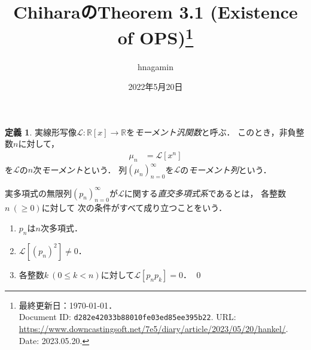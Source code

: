 \documentclass{jlreq}
\theoremstyle{definition}
\newtheorem{definition}[theorem]{定義}
\newcommand{\functype}[3]{#1\colon#2\longrightarrow#3}
\newcommand{\mcL}{\mathcal{L}}
\newcommand{\polynoms}[2]{#1[#2]}
\newcommand{\realnums}{\mathbb{R}}
\newcommand{\sequence}[3]{\sequenceparen{#1}{#2}{#3}{(}{)}} %
\newcommand{\sequenceparen}[5]{{#4#1#5}_{#2}^{#3}}
\begin{document}
\title{ChiharaのTheorem 3.1 (Existence of OPS)\thanks{%
  最終更新日：{\today}．\\
  Document ID: \texttt{d282e42033b88010fe03ed85ee395b22}.
  URL: \url{https://www.downcastingsoft.net/7e5/diary/article/2023/05/20/hankel/}.
  Date: 2023.05.20.
}}
\author{hnagamin}
\date{2022年5月20日}
\maketitle

\begin{definition}
  実線形写像\(\functype{\mcL}{\polynoms{\realnums}{x}}{\realnums}\)を\emph{モーメント汎関数}と呼ぶ．
  このとき，非負整数\(n\)に対して，
  \begin{align}
    \mu_n &= \mcL[x^n]
  \end{align}
  を\(\mcL\)の\(n\)次\emph{モーメント}という．
  列\(\sequence{\mu_n}{n=0}{\infty}\)を\(\mcL\)の\emph{モーメント列}という．

  実多項式の無限列\(\sequence{p_n}{n=0}{\infty}\)が\(\mcL\)に関する\emph{直交多項式系}であるとは，
  各整数\(n\:(\ge0)\)に対して
  次の条件がすべて成り立つことをいう．
  \begin{enumerate}
    \item \(p_n\)は\(n\)次多項式．
    \item \(\mcL[(p_n)^2]\neq0\)．
    \item 各整数\(k\:(0\le k<n)\)に対して\(\mcL[p_n p_k]=0\)．
    \qed
  \end{enumerate}
\end{definition}
\end{document}
